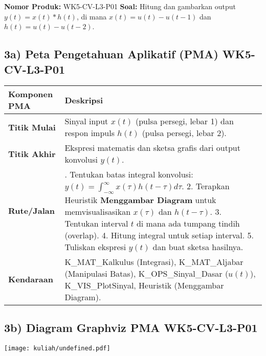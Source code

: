 \documentclass[
  letterpaper,
  DIV=11,
  numbers=noendperiod]{scrreprt}
\begin{document}
\textbf{Nomor Produk:} WK5-CV-L3-P01 \textbf{Soal:} Hitung dan gambarkan
output \(y(t) = x(t) * h(t)\), di mana \(x(t) = u(t) - u(t-1)\) dan
\(h(t) = u(t) - u(t-2)\).

\subsection{3a) Peta Pengetahuan Aplikatif (PMA)
WK5-CV-L3-P01}\label{a-peta-pengetahuan-aplikatif-pma-wk5-cv-l3-p01}

\begin{longtable}[]{@{}
  >{\raggedright\arraybackslash}p{}
  >{\raggedright\arraybackslash}p{}@{}}
\toprule\noalign{}
\begin{minipage}[b]{\linewidth}\raggedright
Komponen PMA
\end{minipage} & \begin{minipage}[b]{\linewidth}\raggedright
Deskripsi
\end{minipage} \\
\midrule\noalign{}
\endhead
\bottomrule\noalign{}
\endlastfoot
\textbf{Titik Mulai} & Sinyal input \(x(t)\) (pulsa persegi, lebar 1)
dan respon impuls \(h(t)\) (pulsa persegi, lebar 2). \\
\textbf{Titik Akhir} & Ekspresi matematis dan sketsa grafis dari output
konvolusi \(y(t)\). \\
\textbf{Rute/Jalan} & 1. Tentukan batas integral konvolusi:
\(y(t) = \int_{-\infty}^{\infty} x(\tau)h(t-\tau)d\tau\). 2. Terapkan
Heuristik \textbf{Menggambar Diagram} untuk memvisualisasikan
\(x(\tau)\) dan \(h(t-\tau)\). 3. Tentukan interval \(t\) di mana ada
tumpang tindih (overlap). 4. Hitung integral untuk setiap interval. 5.
Tuliskan ekspresi \(y(t)\) dan buat sketsa hasilnya. \\
\textbf{Kendaraan} & K\_MAT\_Kalkulus (Integrasi), K\_MAT\_Aljabar
(Manipulasi Batas), K\_OPS\_Sinyal\_Dasar (\(u(t)\)),
K\_VIS\_PlotSinyal, Heuristik (Menggambar Diagram). \\
\end{longtable}

\subsection{3b) Diagram Graphviz PMA
WK5-CV-L3-P01}\label{b-diagram-graphviz-pma-wk5-cv-l3-p01}

\texttt{[image: kuliah/undefined.pdf]}
\end{document}
